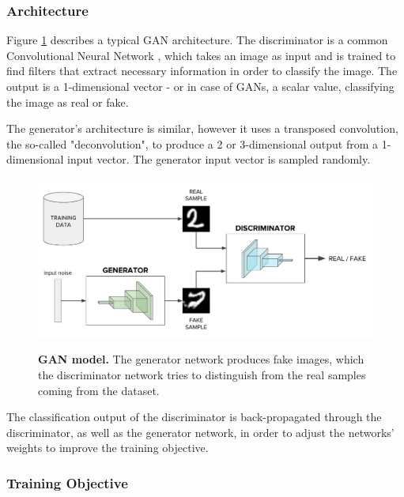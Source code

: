 \documentclass{article}
\begin{document}
\subsubsection{Architecture}

Figure \ref{fig:gan} describes a typical GAN architecture. The discriminator is a common Convolutional Neural Network \cite{lecun_convolutional_1995}, which takes an image as input and is trained to find filters that extract necessary information in order to classify the image. The output is a 1-dimensional vector - or in case of GANs, a scalar value, classifying the image as real or fake. 

The generator's architecture is similar, however it uses a transposed convolution, the so-called "deconvolution", to produce a 2 or 3-dimensional output from a 1-dimensional input vector. The generator input vector is sampled randomly.

\begin{figure}[h]
\centering
{\includegraphics[width=\linewidth]{GAN/gan_model}}
\caption{\label{fig:gan} \textbf{GAN model.} The generator network produces fake images, which the discriminator network tries to distinguish from the real samples coming from the dataset.}
\end{figure}

The classification output of the discriminator is back-propagated  through the discriminator, as well as the generator network, in order to adjust the networks' weights to improve the training objective.

\subsubsection{Training Objective} \label{sec:GAN_training}
\end{document}
